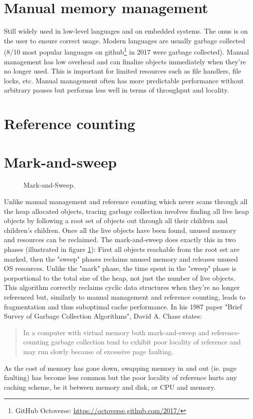 \documentclass[a4paper,oneside]{memoir}
\begin{document}

\section{Manual memory management}
Still widely used in low-level languages and on embedded systems.
The onus is on the user to ensure correct usage.
Modern languages are usually garbage collected (8/10 most popular languages on
github\footnote{GitHub Octoverse: \url{https://octoverse.github.com/2017/}}
in 2017 were garbage collected).
Manual management has low overhead and can finalize objects immediately when
they're no longer used. This is important for limited resources such as file
handlers, file locks, etc.
Manual management often has more predictable performance without arbitrary pauses
but performs less well in terms of throughput and locality.

\section{Reference counting}


\section{Mark-and-sweep}
\begin{figure}[b]
  \centering
  
  \caption{Mark-and-Sweep.}
  \label{mark_and_sweep}
\end{figure}

Unlike manual management and reference counting which never scans through all
the heap allocated objects, tracing garbage collection involves finding all live
heap objects by following a root set of objects out through all their children
and children's children.\cite{Appel:1987} Once all the live objects have been found, unused memory
and resources can be reclaimed.
The mark-and-sweep does exactly this in two phases (illustrated in figure \ref{mark_and_sweep}): First all objects reachable
from the root set are marked, then the "sweep" phases reclaims unused memory and
releases unused OS resources. Unlike the "mark" phase, the time spent in the
"sweep" phase is porportional to the total size of the heap, not just the number
of live objects.\cite{Wilson:1992}
This algorithm correctly reclaims cyclic data structures when they're no longer
referenced but, similarly to manual management and reference counting, leads to
fragmentation and thus suboptimal cache performance.
In his 1987 paper "Brief Survey of Garbage Collection Algorithms", David A. Chase states:
\blockquote{In a computer with virtual memory both mark-and-sweep and
reference-counting garbage collection tend to exhibit poor locality of reference
and may run slowly because of excessive page faulting.}
\cite{Chase:1987} As the cost of memory has gone down, swapping memory in and
out (ie. page faulting) has become less common but the poor locality of reference
hurts any caching scheme, be it between memory and disk, or CPU and memory.\cite{Grunwald:1993}
\end{document}
